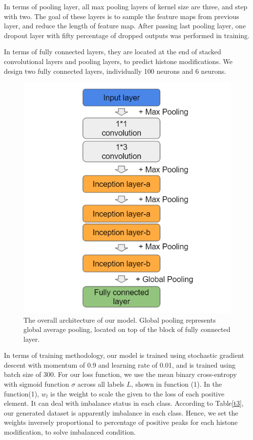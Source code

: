 In terms of pooling layer, all max pooling layers of kernel size are three, and step with two. The goal of these layers is to sample the feature maps from previous layer, and reduce the length of feature map. After passing last pooling layer, one dropout layer with fifty percentage of dropped outputs was performed in training.

In terms of fully connected layers, they are located at the end of stacked convolutional layers and pooling layers, to predict histone modifications. We design two fully connected layers, individually 100 neurons and 6 neurons.

\begin{figure}[H]
    \centering
    \includegraphics[width=0.7\columnwidth]{body/figure/figure12.png}
    \captionsetup{labelfont=bf}
    \renewcommand{\baselinestretch}{1.0}
    \caption[Complete architecture]{The overall architecture of our model. Global pooling represents global average pooling, located on top of the block of fully connected layer.}
    \label{f12}
\end{figure}

In terms of training methodology, our model is trained using stochastic gradient descent with momentum of 0.9 and learning rate of 0.01, and is trained using batch size of 300. For our loss function, we use the mean binary cross-entropy with sigmoid function \(\sigma\) across all labels $L$, shown in function (1). In the function(1), $w_l$ is the weight to scale the given to the loss of each positive element. It can deal with imbalance status in each class. According to Table\ref{t3}, our generated dataset is apparently imbalance in each class. Hence, we set the weights inversely proportional to percentage of positive peaks for each histone modification, to solve imbalanced condition.

